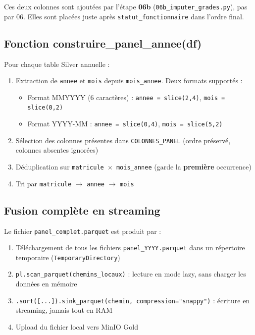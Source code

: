 \documentclass[12pt,a4paper,french]{report}
\begin{document}
\begin{infobox}
  Ces deux colonnes sont ajoutées par l'étape \textbf{06b}
  (\texttt{06b\_imputer\_grades.py}), pas par 06. Elles sont placées juste
  après \texttt{statut\_fonctionnaire} dans l'ordre final.
\end{infobox}

\subsection{Fonction construire\_panel\_annee(df)}

Pour chaque table Silver annuelle :

\begin{enumerate}
  \item Extraction de \texttt{annee} et \texttt{mois} depuis
        \texttt{mois\_annee}. Deux formats supportés :
    \begin{itemize}[nosep]
      \item Format MMYYYY (6 caractères) : \texttt{annee = slice(2,4)},
            \texttt{mois = slice(0,2)}
      \item Format YYYY-MM : \texttt{annee = slice(0,4)},
            \texttt{mois = slice(5,2)}
    \end{itemize}
  \item Sélection des colonnes présentes dans \texttt{COLONNES\_PANEL}
        (ordre préservé, colonnes absentes ignorées)
  \item Déduplication sur \texttt{matricule $\times$ mois\_annee}
        (garde la \textbf{première} occurrence)
  \item Tri par \texttt{matricule} $\rightarrow$ \texttt{annee}
        $\rightarrow$ \texttt{mois}
\end{enumerate}

\subsection{Fusion complète en streaming}

Le fichier \texttt{panel\_complet.parquet} est produit par :
\begin{enumerate}
  \item Téléchargement de tous les fichiers \texttt{panel\_YYYY.parquet}
        dans un répertoire temporaire (\texttt{TemporaryDirectory})
  \item \texttt{pl.scan\_parquet(chemins\_locaux)} : lecture en mode lazy,
        sans charger les données en mémoire
  \item \texttt{.sort([...]).sink\_parquet(chemin, compression="snappy")} :
        écriture en streaming, jamais tout en RAM
  \item Upload du fichier local vers MinIO Gold
\end{enumerate}
\end{document}
